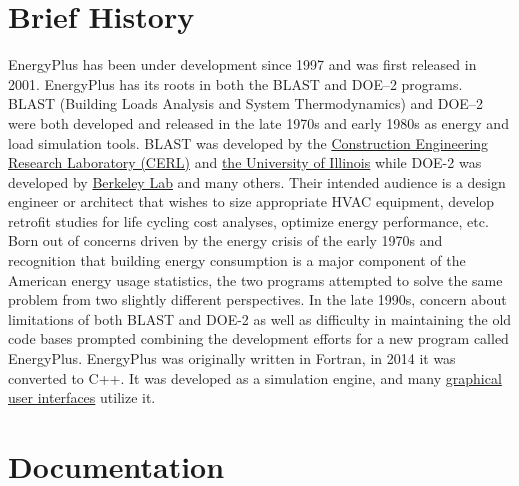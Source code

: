 \section{Brief History}

EnergyPlus has been under development since 1997 and was first released
in 2001. EnergyPlus has its roots in both the BLAST and DOE--2 programs.
BLAST (Building Loads Analysis and System Thermodynamics) and DOE--2
were both developed and released in the late 1970s and early 1980s
as energy and load simulation tools. BLAST was developed by the \href{https://www.erdc.usace.army.mil/Locations/CERL/}{Construction Engineering Research Laboratory (CERL)}
and \href{https://illinois.edu/}{the University of Illinois} while
DOE-2 was developed by \href{https://www.lbl.gov/}{Berkeley Lab}
and many others. Their intended audience is a design engineer or architect
that wishes to size appropriate HVAC equipment, develop retrofit studies
for life cycling cost analyses, optimize energy performance, etc.
Born out of concerns driven by the energy crisis of the early 1970s
and recognition that building energy consumption is a major component
of the American energy usage statistics, the two programs attempted
to solve the same problem from two slightly different perspectives.
In the late 1990s, concern about limitations of both BLAST and DOE-2
as well as difficulty in maintaining the old code bases prompted combining
the development efforts for a new program called EnergyPlus. EnergyPlus
was originally written in Fortran, in 2014 it was converted to C++.
It was developed as a simulation engine, and many \href{https://www.buildingenergysoftwaretools.com/}{graphical user interfaces}
utilize it.

\section{Documentation}

